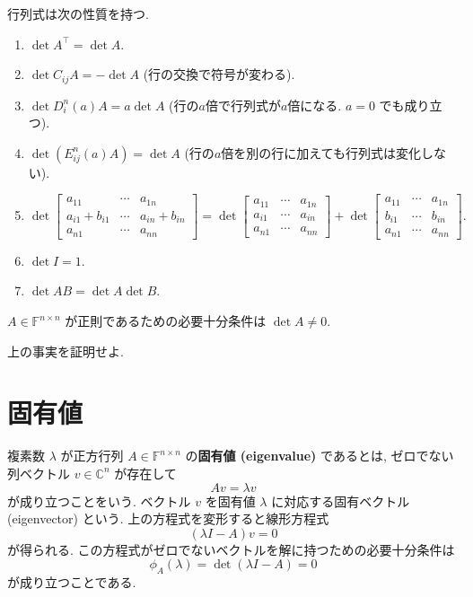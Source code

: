 \documentclass[a4paper]{scrbook}
\providecommand{\tightlist}{%
  \setlength{\itemsep}{0pt}\setlength{\parskip}{0pt}}
\theoremstyle{definition}
\let\BeginKnitrBlock\begin \let\EndKnitrBlock\end
\begin{document}
\BeginKnitrBlock{proposition}
\protect\hypertarget{prp:unnamed-chunk-52}{}{\label{prp:unnamed-chunk-52}}行列式は次の性質を持つ.

\begin{enumerate}
\def\labelenumi{\arabic{enumi}.}
\tightlist
\item
  \(\det A^{\top}=\det A\).
\item
  \(\det C_{ij}A=-\det A\) (行の交換で符号が変わる).
\item
  \(\det D_{i}^{n}(a)A=a\det A\) (行の\(a\)倍で行列式が\(a\)倍になる.
  \(a=0\) でも成り立つ).
\item
  \(\det\left(E_{ij}^{n}(a)A\right)=\det A\)
  (行の\(a\)倍を別の行に加えても行列式は変化しない).
\item
  \[
    \det\left[\begin{array}{ccc}
    a_{11} & \cdots & a_{1n}\\
    a_{i1}+b_{i1} & \cdots & a_{in}+b_{in}\\
    a_{n1} & \cdots & a_{nn}
    \end{array}\right]=\det\left[\begin{array}{ccc}
    a_{11} & \cdots & a_{1n}\\
    a_{i1} & \cdots & a_{in}\\
    a_{n1} & \cdots & a_{nn}
    \end{array}\right]+\det\left[\begin{array}{ccc}
    a_{11} & \cdots & a_{1n}\\
    b_{i1} & \cdots & b_{in}\\
    a_{n1} & \cdots & a_{nn}
    \end{array}\right].
  \]
\item
  \(\det I=1\).
\item
  \(\det AB=\det A\det B\).
\end{enumerate}
\EndKnitrBlock{proposition}

\BeginKnitrBlock{fact}
\(A\in\mathbb{F}^{n\times n}\) が正則であるための必要十分条件は
\(\det A\neq0\).
\EndKnitrBlock{fact}

\BeginKnitrBlock{exercise}
上の事実を証明せよ.
\EndKnitrBlock{exercise}

\section{固有値}

複素数 \(\lambda\) が正方行列 \(A\in\mathbb{F}^{n\times n}\)
の\textbf{固有値 (eigenvalue)} であるとは, ゼロでない列ベクトル
\(v\in\mathbb{C}^{n}\) が存在して \[
  Av=\lambda v
\] が成り立つことをいう. ベクトル \(v\) を固有値 \(\lambda\)
に対応する固有ベクトル (eigenvector) という.
上の方程式を変形すると線形方程式 \[
  (\lambda I-A)v=0
\] が得られる.
この方程式がゼロでないベクトルを解に持つための必要十分条件は \[
  \phi_{A}(\lambda)=\det(\lambda I-A)=0
\] が成り立つことである.
\end{document}

